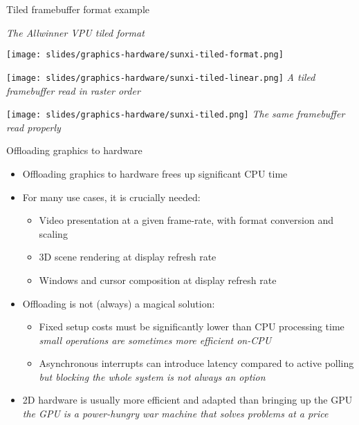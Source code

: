 \begin{frame}{Tiled framebuffer format example}
  \begin{minipage}{0.45\textwidth}
    \centering
    \textit{\small The Allwinner VPU tiled format}
  \end{minipage}
  \hfill
  \begin{minipage}{0.45\textwidth}
    \centering
    \vspace{1em}
    \texttt{[image: slides/graphics-hardware/sunxi-tiled-format.png]}\\
  \end{minipage}
  \vspace{2em}
  \begin{minipage}[b]{0.45\textwidth}
    \centering
    \vspace{1em}
    \texttt{[image: slides/graphics-hardware/sunxi-tiled-linear.png]}
    \textit{\small A tiled framebuffer read in raster order}
  \end{minipage}
  \hfill
  \begin{minipage}[b]{0.45\textwidth}
    \centering
    \vspace{1em}
    \texttt{[image: slides/graphics-hardware/sunxi-tiled.png]}
    \textit{\small The same framebuffer read properly}
  \end{minipage}
\end{frame}

\begin{frame}{Offloading graphics to hardware}
  \begin{itemize}
  \item Offloading graphics to hardware frees up significant CPU time
  \item For many use cases, it is crucially needed:
    \begin{itemize}
    \item Video presentation at a given frame-rate, with format conversion and scaling
    \item 3D scene rendering at display refresh rate
    \item Windows and cursor composition at display refresh rate
    \end{itemize}
  \item Offloading is not (always) a magical solution:
    \begin{itemize}
    \item Fixed setup costs must be significantly lower than CPU processing time\\
      \textit{small operations are sometimes more efficient on-CPU}
    \item Asynchronous interrupts can introduce latency compared to active polling\\
      \textit{but blocking the whole system is not always an option}
    \end{itemize}
  \item 2D hardware is usually more efficient and adapted than bringing up the GPU\\
    \textit{the GPU is a power-hungry war machine that solves problems at a price}
  \end{itemize}
\end{frame}

